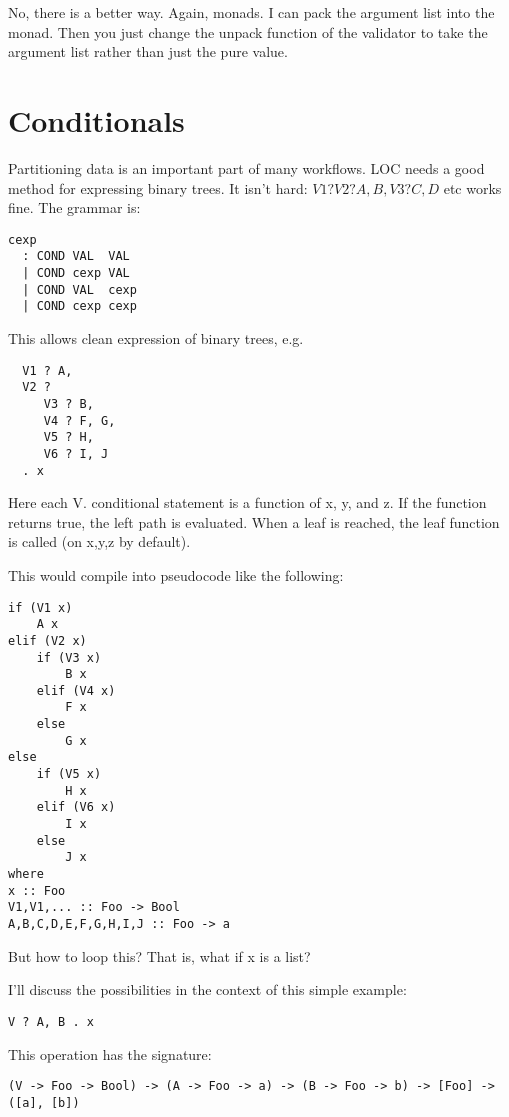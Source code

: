 \documentclass[12pt]{article}
\begin{document}
No, there is a better way. Again, monads. I can pack the argument list into the
monad. Then you just change the unpack function of the validator to take the
argument list rather than just the pure value.

\section{Conditionals}

Partitioning data is an important part of many workflows. LOC needs a good
method for expressing binary trees. It isn't hard: $V1 ? V2 ? A, B, V3 ? C, D$ etc
works fine. The grammar is:

\begin{verbatim}
cexp
  : COND VAL  VAL
  | COND cexp VAL
  | COND VAL  cexp
  | COND cexp cexp
\end{verbatim}

This allows clean expression of binary trees, e.g.

\begin{verbatim}
  V1 ? A,
  V2 ?
     V3 ? B,
     V4 ? F, G,
     V5 ? H,
     V6 ? I, J
  . x
\end{verbatim}

Here each V. conditional statement is a function of x, y, and z. If the
function returns true, the left path is evaluated. When a leaf is reached, the
leaf function is called (on x,y,z by default).

This would compile into pseudocode like the following:

\begin{verbatim}
if (V1 x)
    A x
elif (V2 x)
    if (V3 x)
        B x
    elif (V4 x)
        F x
    else
        G x
else
    if (V5 x)
        H x
    elif (V6 x)
        I x
    else
        J x
where
x :: Foo
V1,V1,... :: Foo -> Bool
A,B,C,D,E,F,G,H,I,J :: Foo -> a
\end{verbatim}

But how to loop this? That is, what if x is a list?

I'll discuss the possibilities in the context of this simple example:

\begin{verbatim}
V ? A, B . x
\end{verbatim}

This operation has the signature:

\begin{verbatim}
(V -> Foo -> Bool) -> (A -> Foo -> a) -> (B -> Foo -> b) -> [Foo] -> ([a], [b])
\end{verbatim}
\end{document}
